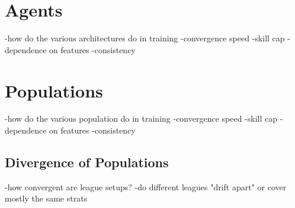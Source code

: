 \section{Agents}
-how do the various architectures do in training
    -convergence speed
    -skill cap
    -dependence on features
    -consistency

\section{Populations}
-how do the various population do in training
    -convergence speed
    -skill cap
    -dependence on features
    -consistency

\subsection{Divergence of Populations}
-how convergent are league setups?
    -do different leagues "drift apart" or cover mostly the same strats